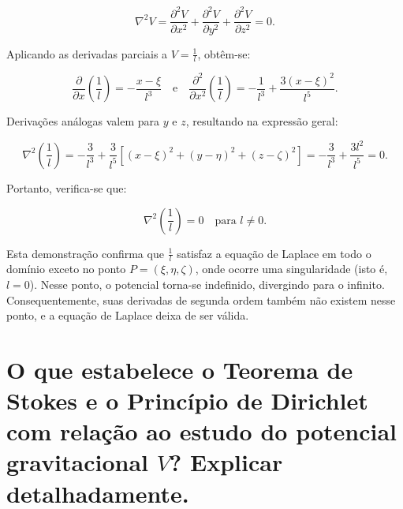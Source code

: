 \[
\nabla^2 V = \frac{\partial^2 V}{\partial x^2} + \frac{\partial^2 V}{\partial y^2} + \frac{\partial^2 V}{\partial z^2} = 0 \text{.}
\]

\noindent
Aplicando as derivadas parciais a \( V = \frac{1}{l} \), obtêm-se:

\[
\frac{\partial}{\partial x} \left( \frac{1}{l} \right) = -\frac{x - \xi}{l^3} \quad \text{e} \quad \frac{\partial^2}{\partial x^2} \left( \frac{1}{l} \right) = -\frac{1}{l^3} + \frac{3(x - \xi)^2}{l^5} \text{.}
\]

\noindent
Derivações análogas valem para \( y \) e \( z \), resultando na expressão geral:

\[
\nabla^2 \left( \frac{1}{l} \right) =
- \frac{3}{l^3} + \frac{3}{l^5} \left[(x - \xi)^2 + (y - \eta)^2 + (z - \zeta)^2\right] = -\frac{3}{l^3} + \frac{3l^2}{l^5} = 0 \text{.}
\]

\noindent
Portanto, verifica-se que:

\[
\nabla^2 \left( \frac{1}{l} \right) = 0 \quad \text{para } l \neq 0 \text{.}
\]

\noindent
Esta demonstração confirma que \( \frac{1}{l} \) satisfaz a equação de Laplace em todo o domínio exceto no ponto \( P = (\xi, \eta, \zeta) \), onde ocorre uma singularidade (isto é, \( l = 0 \)). Nesse ponto, o potencial torna-se indefinido, divergindo para o infinito. Consequentemente, suas derivadas de segunda ordem também não existem nesse ponto, e a equação de Laplace deixa de ser válida.









\section{O que estabelece o Teorema de Stokes e o Princípio de Dirichlet com relação ao estudo do potencial gravitacional $V$? Explicar detalhadamente.}


